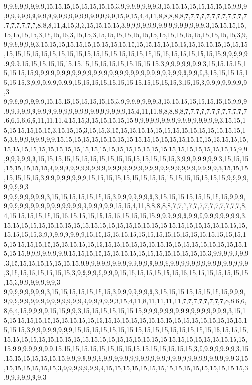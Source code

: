 9,9,9,9,9,9,9,9,15,15,15,15,15,15,15,15,3,9,9,9,9,9,9,9,3,15,15,15,15,15,15,15,15,9,9,9,9,9,9,9,9,9,9,9,9,9,9,9,9,9,9,9,9,9,9,9,9,15,9,15,4,4,11,8,8,8,8,8,7,7,7,7,7,7,7,7,7,7,7,7,7,7,7,7,7,7,8,8,8,11,4,15,3,3,15,15,15,15,3,9,9,9,9,9,9,9,9,9,9,9,9,9,9,9,3,15,15,15,15,15,15,15,15,3,15,15,15,3,15,15,3,15,15,15,15,15,15,15,15,15,15,15,15,15,15,15,15,3,9,9,9,9,9,9,9,3,15,15,15,15,15,15,15,15,15,15,15,15,15,15,15,15,15,15,15,15,15,15,15,15,15,15,15,15,15,15,15,15,15,15,15,15,15,15,15,15,15,15,15,15,15,15,15,15,15,9,9,9,9,9,9,9,9,15,15,15,15,15,15,15,15,15,15,15,15,15,15,15,15,3,9,9,9,9,9,9,9,3,15,15,15,15,15,15,15,15,9,9,9,9,9,9,9,9,9,9,9,9,9,9,9,9,9,9,9,9,9,9,9,9,9,9,9,9,9,9,9,9,3,15,15,15,15,15,15,15,3,9,9,9,9,9,9,9,9,15,15,15,15,15,15,15,15,15,15,15,15,3,15,15,3,9,9,9,9,9,9,9,9,3
9,9,9,9,9,9,9,9,15,15,15,15,15,15,15,15,3,9,9,9,9,9,9,9,3,15,15,15,15,15,15,15,15,9,9,9,9,9,9,9,9,9,9,9,9,9,9,9,9,9,9,9,9,9,9,9,9,9,9,15,4,11,11,8,8,8,8,8,7,7,7,7,7,7,7,7,7,7,7,7,6,6,6,6,6,6,11,11,11,4,15,15,3,15,15,15,15,15,9,9,9,9,9,9,9,9,9,9,9,9,9,9,9,9,3,15,15,15,15,15,15,15,15,3,15,15,15,3,15,15,3,15,15,15,15,15,15,15,15,15,15,15,15,15,15,15,15,3,9,9,9,9,9,9,9,9,15,15,15,15,15,15,15,15,15,15,15,15,15,15,15,15,15,15,15,15,15,15,15,15,15,15,15,15,15,15,15,15,15,15,15,15,15,15,15,15,15,15,15,15,15,15,15,15,15,9,9,9,9,9,9,9,9,15,15,15,15,15,15,15,15,15,15,15,15,15,15,15,15,3,9,9,9,9,9,9,9,3,15,15,15,15,15,15,15,15,9,9,9,9,9,9,9,9,9,9,9,9,9,9,9,9,9,9,9,9,9,9,9,9,9,9,9,9,9,9,9,9,3,15,15,15,15,15,15,15,3,9,9,9,9,9,9,9,9,15,15,15,15,15,15,15,15,15,15,15,15,15,15,15,15,9,9,9,9,9,9,9,9,3
9,9,9,9,9,9,9,9,3,15,15,15,15,15,15,15,3,9,9,9,9,9,9,9,3,15,15,15,15,15,15,15,15,9,9,9,9,9,9,9,9,9,9,9,9,9,9,9,9,9,9,9,9,9,9,9,9,15,15,4,11,8,8,8,8,8,7,7,7,7,7,7,7,7,7,7,7,7,7,8,4,15,15,15,15,15,15,15,15,15,15,15,15,15,15,15,15,15,9,9,9,9,9,9,9,9,9,9,9,9,9,9,9,9,3,15,15,15,15,15,15,15,15,15,15,15,15,15,15,15,15,15,15,15,15,15,15,15,15,15,15,15,15,15,15,15,15,3,9,9,9,9,9,9,9,9,15,15,15,15,15,15,15,15,15,15,15,15,15,15,15,15,15,15,15,15,15,15,15,15,15,15,15,15,15,15,15,15,15,15,15,15,15,15,15,15,15,15,15,15,15,15,15,15,15,9,9,9,9,9,9,9,9,15,15,15,15,15,15,15,15,15,15,15,15,15,15,15,15,3,9,9,9,9,9,9,9,3,15,15,15,15,15,15,15,15,9,9,9,9,9,9,9,9,9,9,9,9,9,9,9,9,9,9,9,9,9,9,9,9,9,9,9,9,9,9,9,9,3,15,15,15,15,15,15,15,3,9,9,9,9,9,9,9,9,15,15,15,15,15,15,15,15,15,15,15,15,15,15,15,15,3,9,9,9,9,9,9,9,3
9,9,9,9,9,9,9,9,3,15,15,15,15,15,15,15,3,9,9,9,9,9,9,9,3,15,15,15,15,15,15,15,15,9,9,9,9,9,9,9,9,9,9,9,9,9,9,9,9,9,9,9,9,9,9,9,9,3,15,4,11,8,11,11,11,11,7,7,7,7,7,7,7,7,8,8,6,6,8,6,4,15,9,9,9,9,15,15,9,9,3,15,15,15,15,15,15,15,9,9,9,9,9,9,9,9,9,9,9,9,9,9,9,9,3,15,15,15,15,15,15,15,15,15,15,15,15,15,15,15,15,15,15,15,15,15,15,15,15,15,15,15,15,15,15,15,15,3,9,9,9,9,9,9,9,9,15,15,15,15,15,15,15,15,15,15,15,15,15,15,15,15,15,15,15,15,15,15,15,15,15,15,15,15,15,15,15,15,15,15,15,15,15,15,15,15,15,15,15,15,15,15,15,15,15,9,9,9,9,9,9,9,9,15,15,15,15,15,15,15,15,15,15,15,15,15,15,15,15,3,9,9,9,9,9,9,9,3,15,15,15,15,15,15,15,15,9,9,9,9,9,9,9,9,9,9,9,9,9,9,9,9,9,9,9,9,9,9,9,9,9,9,9,9,9,9,9,9,3,15,15,15,15,15,15,15,3,9,9,9,9,9,9,9,9,15,15,15,15,15,15,15,15,15,15,15,15,15,15,15,15,3,9,9,9,9,9,9,9,3
